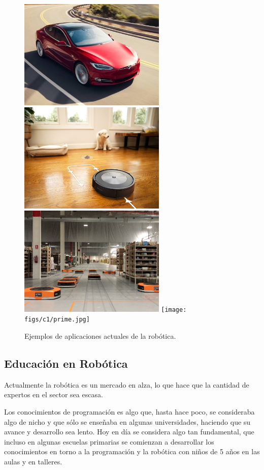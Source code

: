 \begin{figure} [H]
  \begin{center}
    \includegraphics[width=7cm]{figs/c1/tesla-model-s-5_750x.jpg}
    \includegraphics[width=7cm]{figs/c1/roomba.jpg}
    \includegraphics[width=7cm]{figs/c1/almacen.png}
    \texttt{[image: figs/c1/prime.jpg]}
  \end{center}
  \caption[Ejemplos aplicaciones actuales robótica]{Ejemplos de aplicaciones actuales de la robótica.}
  \label{fig:rob_varios}
\end{figure}

\subsection{Educación en Robótica}
\label{subsec:urjc}

Actualmente la robótica es un mercado en alza, lo que hace que la cantidad de expertos en el sector sea escasa. 

Los conocimientos de programación es algo que, hasta hace poco, se consideraba algo de nicho y que sólo se enseñaba en algunas universidades, haciendo que
su avance y desarrollo sea lento. Hoy en día se considera algo tan fundamental, que incluso en algunas escuelas primarias se comienzan a desarrollar los
conocimientos en torno a la programación y la robótica con niños de 5 años en las aulas y en talleres.\\


